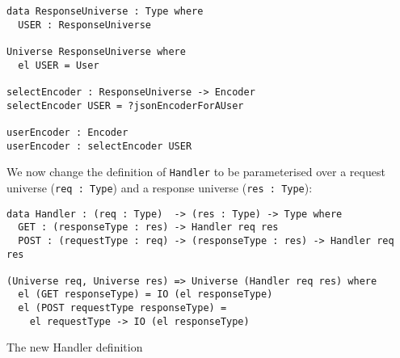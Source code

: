 \documentclass[12pt,a4paper]{article}
\begin{document}
\begin{verbatim}
data ResponseUniverse : Type where
  USER : ResponseUniverse

Universe ResponseUniverse where
  el USER = User

selectEncoder : ResponseUniverse -> Encoder
selectEncoder USER = ?jsonEncoderForAUser

userEncoder : Encoder
userEncoder : selectEncoder USER
\end{verbatim}

We now change the definition of \texttt{Handler} to be parameterised over a request universe (\texttt{req : Type}) and a response universe (\texttt{res : Type}):
\begin{listing}
  \begin{verbatim}
data Handler : (req : Type)  -> (res : Type) -> Type where
  GET : (responseType : res) -> Handler req res
  POST : (requestType : req) -> (responseType : res) -> Handler req res

(Universe req, Universe res) => Universe (Handler req res) where
  el (GET responseType) = IO (el responseType)
  el (POST requestType responseType) =
    el requestType -> IO (el responseType)
  \end{verbatim}
  \caption{The new Handler definition}
\end{listing}
\end{document}
